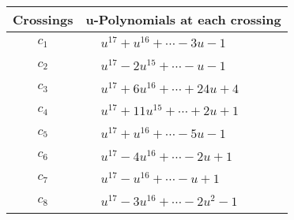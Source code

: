 \documentclass[1p]{elsarticle_modified}
\theoremstyle{definition}
\begin{document}
\begin{tabular}{m{50pt}|m{274pt}}
Crossings & \hspace{64pt}u-Polynomials at each crossing \\
\hline $$\begin{aligned}c_{1}\end{aligned}$$&$\begin{aligned}
&u^{17}+u^{16}+\cdots-3 u-1
\end{aligned}$\\
\hline $$\begin{aligned}c_{2}\end{aligned}$$&$\begin{aligned}
&u^{17}-2 u^{15}+\cdots- u-1
\end{aligned}$\\
\hline $$\begin{aligned}c_{3}\end{aligned}$$&$\begin{aligned}
&u^{17}+6 u^{16}+\cdots+24 u+4
\end{aligned}$\\
\hline $$\begin{aligned}c_{4}\end{aligned}$$&$\begin{aligned}
&u^{17}+11 u^{15}+\cdots+2 u+1
\end{aligned}$\\
\hline $$\begin{aligned}c_{5}\end{aligned}$$&$\begin{aligned}
&u^{17}+u^{16}+\cdots-5 u-1
\end{aligned}$\\
\hline $$\begin{aligned}c_{6}\end{aligned}$$&$\begin{aligned}
&u^{17}-4 u^{16}+\cdots-2 u+1
\end{aligned}$\\
\hline $$\begin{aligned}c_{7}\end{aligned}$$&$\begin{aligned}
&u^{17}- u^{16}+\cdots- u+1
\end{aligned}$\\
\hline $$\begin{aligned}c_{8}\end{aligned}$$&$\begin{aligned}
&u^{17}-3 u^{16}+\cdots-2 u^2-1
\end{aligned}$\\

\end{tabular}
\end{document}
